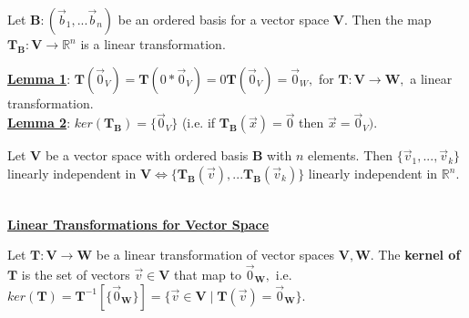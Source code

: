 \documentclass{article}
\begin{document}
\begin{theorem}
Let $\boldsymbol{B}: (\vec{b}_1, ... \vec{b}_n)$ be an ordered basis for a vector space $\boldsymbol{V}.$ Then the map $\boldsymbol{T}_{\boldsymbol{B}}: \boldsymbol{V} \rightarrow \mathbb{R}^n$ is a linear transformation. \\
\end{theorem}

\textbf{\underline{Lemma 1}}: $\boldsymbol{T}(\vec{0}_{V}) = \boldsymbol{T}(0 *\vec{0}_{V}) = 0\boldsymbol{T}(\vec{0}_{V}) = \vec{0}_{W},$ for $\boldsymbol{T}: \boldsymbol{V} \rightarrow \boldsymbol{W},$ a linear transformation. \\

\textbf{\underline{Lemma 2}}: $ker(\boldsymbol{T}_{\boldsymbol{B}}) = \{\vec{0}_{V}\}$ (i.e. if $\boldsymbol{T}_{\boldsymbol{B}}(\vec{x}) = \vec{0}$ then $\vec{x} = \vec{0}_{V}).$ \\

\begin{theorem}
Let $\boldsymbol{V}$ be a vector space with ordered basis $\boldsymbol{B}$ with $n$ elements. Then $\{\vec{v}_1, ..., \vec{v}_k\}$ linearly independent in $\boldsymbol{V} \iff \{\boldsymbol{T}_{\boldsymbol{B}}(\vec{v}), ... \boldsymbol{T}_{\boldsymbol{B}}(\vec{v}_k)\}$ linearly independent in $\mathbb{R}^n.$ \\ \\
\end{theorem}

\underline{\textbf{Linear Transformations for Vector Space}}
\begin{definition}
Let $\boldsymbol{T}: \boldsymbol{V} \rightarrow \boldsymbol{W}$ be a linear transformation of vector spaces $\boldsymbol{V, W}.$ The \textbf{kernel of $\boldsymbol{T}$} is the set of vectors $\vec{v} \in \boldsymbol{V}$ that map to $\vec{0}_{\boldsymbol{W}},$ i.e. $ker(\boldsymbol{T}) = \boldsymbol{T}^{-1}[\{\vec{0}_{\boldsymbol{W}}\}] = \{\vec{v} \in \boldsymbol{V} \mid \boldsymbol{T}(\vec{v}) = \vec{0}_{\boldsymbol{W}} \}.$
\end{definition}
\end{document}

